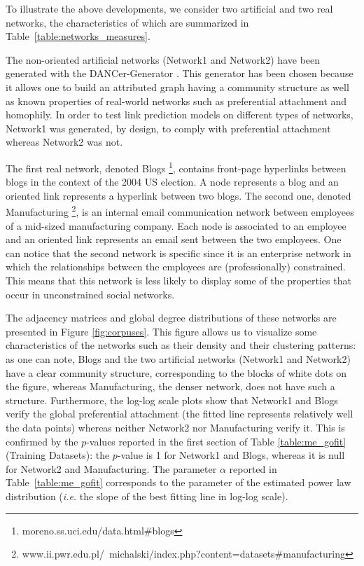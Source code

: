To illustrate the above developments, we consider two artificial and two real networks, the characteristics of which are summarized in Table~\ref{table:networks_measures}.



The non-oriented artificial networks (Network1 and Network2) have been generated with the DANCer-Generator \cite{largeron2015}. This generator has been chosen because it allows one to build an attributed graph having a community structure as well as known properties of real-world networks such as preferential attachment and homophily. In order to test link prediction models on different types of networks, Network1 was generated, by design, to comply with preferential attachment whereas Network2 was not.

The first real network, denoted Blogs \footnote{moreno.ss.uci.edu/data.html\#blogs}, contains front-page hyperlinks between blogs in the context of the 2004 US election. A node represents a blog and an oriented link represents a hyperlink between two blogs. The second one, denoted Manufacturing \footnote{www.ii.pwr.edu.pl/~michalski/index.php?content=datasets\#manufacturing}, is an internal email communication network between employees of a mid-sized manufacturing company. Each node is associated to an employee and an oriented link represents an email sent between the two employees. One can notice that the second network is specific since it is an enterprise network in which the relationships between the employees are (professionally) constrained. This means that this network is less likely to display some of the properties that occur in unconstrained social networks.

The adjacency matrices and global degree distributions of these networks are presented in Figure \ref{fig:corpuses}. This figure allows us to visualize some characteristics of the networks such as their density and their clustering patterns: as one can note, Blogs and the two artificial networks (Network1 and Network2) have a clear community structure, corresponding to the blocks of white dots on the figure, whereas Manufacturing, the denser network, does not have such a structure. Furthermore, the log-log scale plots show that Network1 and Blogs verify the  global preferential attachment (the fitted line represents relatively well the data points) whereas neither Network2 nor Manufacturing verify it. This is confirmed by the $p$-values reported in the first section of Table \ref{table:me_gofit} (Training Datasets): the $p$-value is 1 for Network1 and Blogs, whereas it is null for Network2 and Manufacturing. The parameter $\alpha$ reported in Table~\ref{table:me_gofit} corresponds to the parameter of the estimated power law distribution (\textit{i.e.} the slope of the best fitting line in log-log scale).

